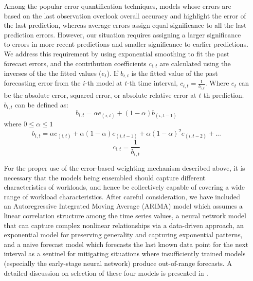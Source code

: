 Among the popular error quantification techniques, models whose errors are based on the last observation overlook overall accuracy and highlight the error of the last prediction, whereas average errors assign equal significance to all the last prediction errors. However, our situation requires assigning a larger significance to errors in more recent predictions and smaller significance to earlier predictions. We address this requirement by using exponential smoothing to fit the past forecast errors, and the contribution coefficients $c_{i,t}$ are calculated using the inverses of the the fitted values ($e_{t}$). If $b_{i,t}$ is the fitted value of the past forecasting error from the $i$-th model at $t$-th time interval, $c_{i,t}=\frac{1}{b_{i,t}}$. Where $e_{t}$ can be the absolute error, squared error, or absolute relative error at $t$-th prediction. $b_{i,t}$ can be defined as:
\begin{equation} \label{eq:1}
b_{i,t}= \alpha e_{(i,t)} + (1-\alpha)b_{(i,t-1)}
\end{equation}
where $0\leq \alpha \leq 1$
\begin{equation}\nonumber
b_{i,t}=\alpha e_{(i,t)} + \alpha(1-\alpha)e_{(i,t-1)}+\alpha(1-\alpha)^2e_{(i,t-2)}+ . ..
\end{equation}
\begin{equation}
c_{i,t}=\frac{1}{b_{i,t}} 
\end{equation}

For the proper use of the error-based weighting mechanism described above, it is necessary that the models being ensembled should capture different characteristics of workloads, and hence be collectively capable of covering a wide range of workload characteristics. After careful consideration, we have included an Autoregressive Integrated Moving Average (ARIMA) model which assumes a linear correlation structure among the time series values, a neural network model that can capture complex nonlinear relationships via a data-driven approach, an exponential model for preserving generality and capturing exponential patterns, and a naive forecast model which forecasts the last known data point for the next interval as a sentinel for mitigating situations where insufficiently trained models (especially the early-stage neural network) produce out-of-range forecasts. A detailed discussion on selection of these four models is presented in .
